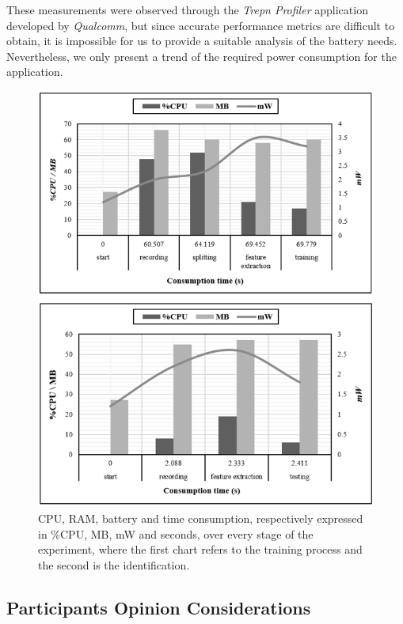 \documentclass[cryptography,article,submit,moreauthors,pdftex,10pt,a4paper]{mdpi}
\begin{document}
These measurements were observed through the \textit{Trepn Profiler} application developed by \textit{Qualcomm}, but since accurate performance metrics are difficult to obtain, it is impossible for us to provide a suitable analysis of the battery needs. Nevertheless, we only present a trend of the required power consumption for the application.

\begin{figure}[H]
	\centering
	\includegraphics[width=10 cm]{11.png}
	\caption{CPU, RAM, battery and time consumption, respectively expressed in \%CPU, MB, mW and seconds, over every stage of the experiment, where the first chart refers to the training process and the second is the identification.}
	\label{fig:11}
\end{figure}

\subsection{Participants Opinion Considerations}
\end{document}
